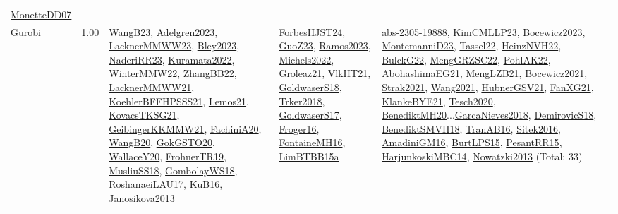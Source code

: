 {\begin{longtable}{p{3cm}r>{\raggedright\arraybackslash}p{6cm}>{\raggedright\arraybackslash}p{6cm}>{\raggedright\arraybackslash}p{8cm}}
\hyperref[detail:MonetteDD07]{MonetteDD07}\\
\index{Gurobi}\index{CPSystems!Gurobi}Gurobi &  1.00 & \hyperref[detail:WangB23]{WangB23}, \hyperref[detail:Adelgren2023]{Adelgren2023}, \hyperref[detail:LacknerMMWW23]{LacknerMMWW23}, \hyperref[detail:Bley2023]{Bley2023}, \hyperref[detail:NaderiRR23]{NaderiRR23}, \hyperref[detail:Kuramata2022]{Kuramata2022}, \hyperref[detail:WinterMMW22]{WinterMMW22}, \hyperref[detail:ZhangBB22]{ZhangBB22}, \hyperref[detail:LacknerMMWW21]{LacknerMMWW21}, \hyperref[detail:KoehlerBFFHPSSS21]{KoehlerBFFHPSSS21}, \hyperref[detail:Lemos21]{Lemos21}, \hyperref[detail:KovacsTKSG21]{KovacsTKSG21}, \hyperref[detail:GeibingerKKMMW21]{GeibingerKKMMW21}, \hyperref[detail:FachiniA20]{FachiniA20}, \hyperref[detail:WangB20]{WangB20}, \hyperref[detail:GokGSTO20]{GokGSTO20}, \hyperref[detail:WallaceY20]{WallaceY20}, \hyperref[detail:FrohnerTR19]{FrohnerTR19}, \hyperref[detail:MusliuSS18]{MusliuSS18}, \hyperref[detail:GombolayWS18]{GombolayWS18}, \hyperref[detail:RoshanaeiLAU17]{RoshanaeiLAU17}, \hyperref[detail:KuB16]{KuB16}, \hyperref[detail:Janosikova2013]{Janosikova2013} & \hyperref[detail:ForbesHJST24]{ForbesHJST24}, \hyperref[detail:GuoZ23]{GuoZ23}, \hyperref[detail:Ramos2023]{Ramos2023}, \hyperref[detail:Michels2022]{Michels2022}, \hyperref[detail:Groleaz21]{Groleaz21}, \hyperref[detail:VlkHT21]{VlkHT21}, \hyperref[detail:GoldwaserS18]{GoldwaserS18}, \hyperref[detail:Trker2018]{Trker2018}, \hyperref[detail:GoldwaserS17]{GoldwaserS17}, \hyperref[detail:Froger16]{Froger16}, \hyperref[detail:FontaineMH16]{FontaineMH16}, \hyperref[detail:LimBTBB15a]{LimBTBB15a} & \hyperref[detail:abs-2305-19888]{abs-2305-19888}, \hyperref[detail:KimCMLLP23]{KimCMLLP23}, \hyperref[detail:Bocewicz2023]{Bocewicz2023}, \hyperref[detail:MontemanniD23]{MontemanniD23}, \hyperref[detail:Tassel22]{Tassel22}, \hyperref[detail:HeinzNVH22]{HeinzNVH22}, \hyperref[detail:BulckG22]{BulckG22}, \hyperref[detail:MengGRZSC22]{MengGRZSC22}, \hyperref[detail:PohlAK22]{PohlAK22}, \hyperref[detail:AbohashimaEG21]{AbohashimaEG21}, \hyperref[detail:MengLZB21]{MengLZB21}, \hyperref[detail:Bocewicz2021]{Bocewicz2021}, \hyperref[detail:Strak2021]{Strak2021}, \hyperref[detail:Wang2021]{Wang2021}, \hyperref[detail:HubnerGSV21]{HubnerGSV21}, \hyperref[detail:FanXG21]{FanXG21}, \hyperref[detail:KlankeBYE21]{KlankeBYE21}, \hyperref[detail:Tesch2020]{Tesch2020}, \hyperref[detail:BenediktMH20]{BenediktMH20}...\hyperref[detail:GarcaNieves2018]{GarcaNieves2018}, \hyperref[detail:DemirovicS18]{DemirovicS18}, \hyperref[detail:BenediktSMVH18]{BenediktSMVH18}, \hyperref[detail:TranAB16]{TranAB16}, \hyperref[detail:Sitek2016]{Sitek2016}, \hyperref[detail:AmadiniGM16]{AmadiniGM16}, \hyperref[detail:BurtLPS15]{BurtLPS15}, \hyperref[detail:PesantRR15]{PesantRR15}, \hyperref[detail:HarjunkoskiMBC14]{HarjunkoskiMBC14}, \hyperref[detail:Nowatzki2013]{Nowatzki2013} (Total: 33)\\

\end{longtable}}
